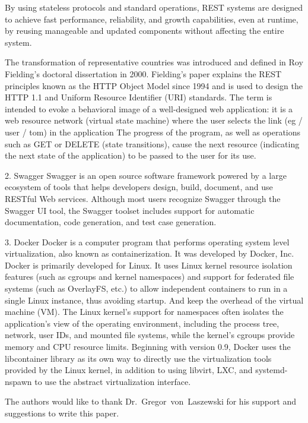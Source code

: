 By using stateless protocols and standard operations, REST 
systems are designed to achieve fast performance, reliability, 
and growth capabilities, even at runtime, by reusing manageable 
and updated components without affecting the entire system.

The transformation of representative countries was introduced and 
defined in Roy Fielding's doctoral dissertation in 2000. 
Fielding's paper explains the REST principles known as the HTTP 
Object Model since 1994 and is used to design the HTTP 1.1 and 
Uniform Resource Identifier (URI) standards. The term is intended 
to evoke a behavioral image of a well-designed web application: it
 is a web resource network (virtual state machine) where the user 
selects the link (eg / user / tom) in the application The progress
 of the program, as well as operations such as GET or DELETE 
(state transitions), cause the next resource (indicating the next 
state of the application) to be passed to the user for its use.

2. Swagger
Swagger is an open source software framework powered by a large 
ecosystem of tools that helps developers design, build, document, 
and use RESTful Web services. Although most users recognize Swagger
 through the Swagger UI tool, the Swagger toolset includes support
 for automatic documentation, code generation, and test case 
generation.

3. Docker
Docker is a computer program that performs operating system level 
virtualization, also known as containerization. It was developed by
 Docker, Inc. Docker is primarily developed for Linux. It uses 
Linux kernel resource isolation features (such as cgroups and 
kernel namespaces) and support for federated file systems (such as
 OverlayFS, etc.) to allow independent containers to run in a 
single Linux instance, thus avoiding startup. And keep the overhead
 of the virtual machine (VM). The Linux kernel's support for 
namespaces often isolates the application's view of the operating 
environment, including the process tree, network, user IDs, and 
mounted file systems, while the kernel's cgroups provide memory and
 CPU resource limits. Beginning with version 0.9, Docker uses the 
libcontainer library as its own way to directly use the 
virtualization tools provided by the Linux kernel, in addition to 
using libvirt, LXC, and systemd-nspawn to use the abstract 
virtualization interface.

\begin{acks}

  The authors would like to thank Dr.~Gregor~von~Laszewski for his
  support and suggestions to write this paper.

\end{acks}



 


